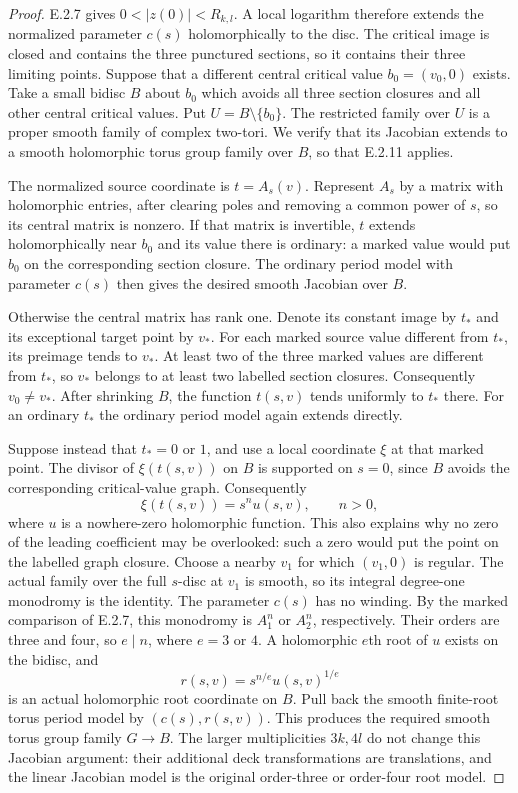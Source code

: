 \begin{proof}
E.2.7 gives $0<|z(0)|<R_{k,l}$.  A local logarithm
therefore extends the normalized parameter $c(s)$
holomorphically to the disc.  The critical image is closed
and contains the three punctured sections, so it contains
their three limiting points.  Suppose that a different
central critical value $b_0=(v_0,0)$ exists.  Take a small
bidisc $B$ about $b_0$ which avoids all three section
closures and all other central critical values.  Put
$U=B\setminus\{b_0\}$.  The restricted family over $U$
is a proper smooth family of complex two-tori.  We verify
that its Jacobian extends to a smooth holomorphic torus
group family over $B$, so that E.2.11 applies.

The normalized source coordinate is $t=A_s(v)$.
Represent $A_s$ by a matrix with holomorphic entries,
after clearing poles and removing a common power of
$s$, so its central matrix is nonzero.  If that matrix
is invertible, $t$ extends holomorphically near $b_0$ and
its value there is ordinary: a marked value would put
$b_0$ on the corresponding section closure.  The
ordinary period model with parameter $c(s)$ then gives
the desired smooth Jacobian over $B$.

Otherwise the central matrix has rank one.  Denote its
constant image by $t_*$ and its exceptional target point
by $v_*$.  For each marked source value different from
$t_*$, its preimage tends to $v_*$.  At least two of the
three marked values are different from $t_*$, so $v_*$
belongs to at least two labelled section closures.
Consequently $v_0\ne v_*$.  After shrinking $B$, the
function $t(s,v)$ tends uniformly to $t_*$ there.
For an ordinary $t_*$ the ordinary period model again
extends directly.

Suppose instead that $t_*=0$ or $1$, and use a local
coordinate $\xi$ at that marked point.  The divisor of
$\xi(t(s,v))$ on $B$ is supported on $s=0$, since $B$
avoids the corresponding critical-value graph.
Consequently
\[
 \xi(t(s,v))=s^n u(s,v),\qquad n>0,
\]
where $u$ is a nowhere-zero holomorphic function.
This also explains why no zero of the leading
coefficient may be overlooked: such a zero would put
the point on the labelled graph closure.
Choose a nearby $v_1$ for which $(v_1,0)$ is regular.
The actual family over the full $s$-disc at $v_1$ is
smooth, so its integral degree-one monodromy is the
identity.  The parameter $c(s)$ has no winding.  By
the marked comparison of E.2.7, this monodromy is
$A_1^n$ or $A_2^n$, respectively.  Their orders are
three and four, so $e\mid n$, where $e=3$ or $4$.
A holomorphic $e$th root of $u$ exists on the bidisc,
and
\[
 r(s,v)=s^{n/e}u(s,v)^{1/e}
\]
is an actual holomorphic root coordinate on $B$.
Pull back the smooth finite-root torus period model
by $(c(s),r(s,v))$.  This produces the required
smooth torus group family $G\to B$.  The larger
multiplicities $3k,4l$ do not change this Jacobian
argument: their additional deck transformations
are translations, and the linear Jacobian model
is the original order-three or order-four root model.


\end{proof}
